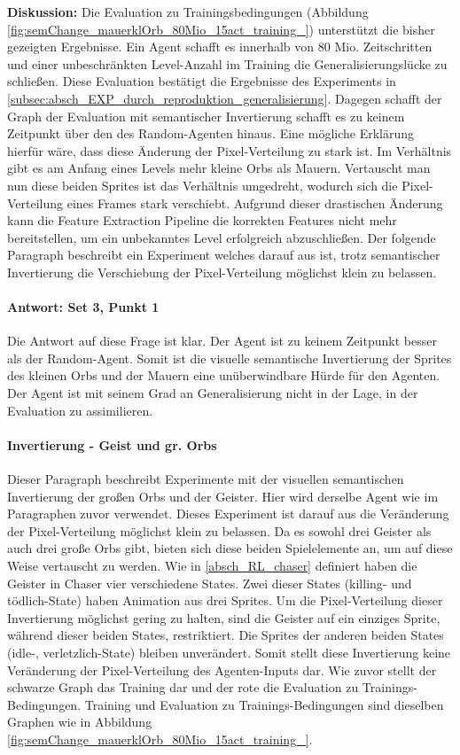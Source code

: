 \textbf{Diskussion:} Die Evaluation zu Trainingsbedingungen (Abbildung \ref{fig:semChange_mauerklOrb_80Mio_15act_training_}) unterstützt die bisher gezeigten Ergebnisse. Ein Agent schafft es innerhalb von 80 Mio. Zeitschritten und einer unbeschränkten Level-Anzahl im Training die Generalisierungslücke zu schließen. Diese Evaluation bestätigt die Ergebnisse des Experiments in \ref{subsec:absch_EXP_durch_reproduktion_generalisierung}. Dagegen schafft der Graph der Evaluation mit semantischer Invertierung schafft es zu keinem Zeitpunkt über den des Random-Agenten hinaus. Eine mögliche Erklärung hierfür wäre, dass diese Änderung der Pixel-Verteilung zu stark ist. Im Verhältnis gibt es am Anfang eines Levels mehr kleine Orbs als Mauern. Vertauscht man nun diese beiden Sprites ist das Verhältnis umgedreht, wodurch sich die Pixel-Verteilung eines Frames stark verschiebt. Aufgrund dieser drastischen Änderung kann die Feature Extraction Pipeline die korrekten Features nicht mehr bereitstellen, um ein unbekanntes Level erfolgreich abzuschließen. Der folgende Paragraph beschreibt ein Experiment welches darauf aus ist, trotz semantischer Invertierung die Verschiebung der Pixel-Verteilung möglichst klein zu belassen.

\paragraph{Antwort: Set 3, Punkt 1}
Die Antwort auf diese Frage ist klar. Der Agent ist zu keinem Zeitpunkt besser als der Random-Agent. Somit ist die visuelle semantische Invertierung der Sprites des kleinen Orbs und der Mauern eine unüberwindbare Hürde für den Agenten. Der Agent ist mit seinem Grad an Generalisierung nicht in der Lage, in der Evaluation zu assimilieren. 

\paragraph{Invertierung - Geist und gr. Orbs}
Dieser Paragraph beschreibt Experimente mit der visuellen semantischen Invertierung der großen Orbs und der Geister. Hier wird derselbe Agent wie im Paragraphen zuvor verwendet. Dieses Experiment ist darauf aus die Veränderung der Pixel-Verteilung möglichst klein zu belassen. Da es sowohl drei Geister als auch drei große Orbs gibt, bieten sich diese beiden Spielelemente an, um auf diese Weise vertauscht zu werden. Wie in \ref{absch_RL_chaser} definiert haben die Geister in Chaser vier verschiedene States. Zwei dieser States (killing- und tödlich-State) haben Animation aus drei Sprites. Um die Pixel-Verteilung dieser Invertierung möglichst gering zu halten, sind die Geister auf ein einziges Sprite, während dieser beiden States, restriktiert. Die Sprites der anderen beiden States (idle-, verletzlich-State) bleiben unverändert. Somit stellt diese Invertierung keine Veränderung der Pixel-Verteilung des Agenten-Inputs dar. Wie zuvor stellt der schwarze Graph das Training dar und der rote die Evaluation zu Trainings-Bedingungen. Training und Evaluation zu Trainings-Bedingungen sind dieselben Graphen wie in Abbildung \ref{fig:semChange_mauerklOrb_80Mio_15act_training_}. 

